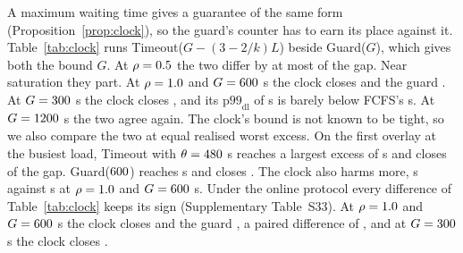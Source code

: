 A maximum waiting time gives a guarantee of the same form (Proposition~\ref{prop:clock}), so
the guard's counter has to earn its place against it. Table~\ref{tab:clock} runs
Timeout($G - (3-2/k)L$) beside Guard($G$), which gives both the bound $G$. At $\rho =
0.5$ the two differ by at most  of the gap. Near saturation they
part. At $\rho = 1.0$ and $G = 600$ s the clock closes  and
the guard . At $G = 300$ s the clock closes , and its
$\mathrm{p99}_{\mathrm{dl}}$ of  s is barely below FCFS's  s. At
$G = 1200$ s the two agree again. The clock's bound is not known to be tight, so
we also compare the two at equal realised worst excess. On the first overlay at the busiest
load, Timeout with $\theta = 480$ s reaches a largest excess of  s and
closes  of the gap. Guard($600$) reaches  s and closes
. The clock also harms more,  s against  s at
$\rho = 1.0$ and $G = 600$ s. Under the online protocol every difference of
Table~\ref{tab:clock} keeps its sign (Supplementary Table~S33). At $\rho = 1.0$ and
$G = 600$ s the clock closes  and the guard , a paired
difference of , and at $G = 300$ s the clock
closes .

